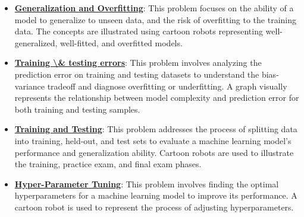 \documentclass{article}%
\begin{document}
\begin{itemize}[leftmargin=*]
\item \href{https://purdue.brightspace.com/d2l/common/assets/pdfjs-d2l-dist/1.0.14-legacy/web/viewer.html?file=\%2Fcontent\%2Fenforced\%2F1095467-wl.202510.CS.24300.001\%2F10L1-CrossValidation.pdf\%3Fou\%3D1095467\&lang=en-us\&container=d2l-fileviewer-rendered-pdf\&fullscreen=d2l-fileviewer-rendered-pdf-dialog\&height=667#page=2}{\textbf{Generalization and Overfitting}}: This problem focuses on the ability of a model to generalize to unseen data, and the risk of overfitting to the training data. The concepts are illustrated using cartoon robots representing well-generalized, well-fitted, and overfitted models.%
\item \href{https://purdue.brightspace.com/d2l/common/assets/pdfjs-d2l-dist/1.0.14-legacy/web/viewer.html?file=\%2Fcontent\%2Fenforced\%2F1095467-wl.202510.CS.24300.001\%2F10L1-CrossValidation.pdf\%3Fou\%3D1095467\&lang=en-us\&container=d2l-fileviewer-rendered-pdf\&fullscreen=d2l-fileviewer-rendered-pdf-dialog\&height=667#page=4}{\textbf{Training \textbackslash{}& testing errors}}: This problem involves analyzing the prediction error on training and testing datasets to understand the bias-variance tradeoff and diagnose overfitting or underfitting. A graph visually represents the relationship between model complexity and prediction error for both training and testing samples.%
\item \href{https://purdue.brightspace.com/d2l/common/assets/pdfjs-d2l-dist/1.0.14-legacy/web/viewer.html?file=\%2Fcontent\%2Fenforced\%2F1095467-wl.202510.CS.24300.001\%2F10L1-CrossValidation.pdf\%3Fou\%3D1095467\&lang=en-us\&container=d2l-fileviewer-rendered-pdf\&fullscreen=d2l-fileviewer-rendered-pdf-dialog\&height=667#page=5}{\textbf{Training and Testing}}: This problem addresses the process of splitting data into training, held-out, and test sets to evaluate a machine learning model's performance and generalization ability. Cartoon robots are used to illustrate the training, practice exam, and final exam phases.%
\item \href{https://purdue.brightspace.com/d2l/common/assets/pdfjs-d2l-dist/1.0.14-legacy/web/viewer.html?file=\%2Fcontent\%2Fenforced\%2F1095467-wl.202510.CS.24300.001\%2F10L1-CrossValidation.pdf\%3Fou\%3D1095467\&lang=en-us\&container=d2l-fileviewer-rendered-pdf\&fullscreen=d2l-fileviewer-rendered-pdf-dialog\&height=667#page=14}{\textbf{Hyper-Parameter Tuning}}: This problem involves finding the optimal hyperparameters for a machine learning model to improve its performance. A cartoon robot is used to represent the process of adjusting hyperparameters.%

\end{itemize}
\end{document}
